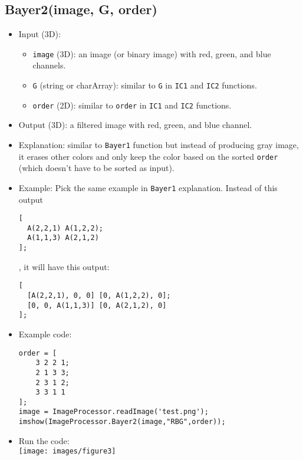 \documentclass[11pt]{amsart}
\theoremstyle{remark}
\providecommand{\tightlist}{%
  \setlength{\itemsep}{0pt}\setlength{\parskip}{0pt}}
\theoremstyle{definition}
\theoremstyle{remark}
\numberwithin{equation}{section}
\begin{document}
\subsection{Bayer2(image, G, order)}\label{bayer2image-g-order}

\begin{itemize}
\item
  Input (3D):

  \begin{itemize}
  \tightlist
  \item
    \texttt{image} (3D): an image (or binary image) with red, green, and
    blue channels.
  \item
    \texttt{G} (string or charArray): similar to \texttt{G} in
    \texttt{IC1} and \texttt{IC2} functions.
  \item
    \texttt{order} (2D): similar to \texttt{order} in \texttt{IC1} and
    \texttt{IC2} functions.
  \end{itemize}
\item
  Output (3D): a filtered image with red, green, and blue channel.
\item
  Explanation: similar to \texttt{Bayer1} function but instead of
  producing gray image, it erases other colors and only keep the color
  based on the sorted \texttt{order} (which doesn't have to be sorted as
  input).
\item
  Example: Pick the same example in \texttt{Bayer1} explanation. Instead
  of this output

\begin{verbatim}
[
  A(2,2,1) A(1,2,2);
  A(1,1,3) A(2,1,2)
];
\end{verbatim}

  , it will have this output:

\begin{verbatim}
[
  [A(2,2,1), 0, 0] [0, A(1,2,2), 0];
  [0, 0, A(1,1,3)] [0, A(2,1,2), 0]
];
\end{verbatim}
\item
  Example code:

\begin{verbatim}
order = [
    3 2 2 1;
    2 1 3 3;
    2 3 1 2;
    3 3 1 1
];
image = ImageProcessor.readImage('test.png');
imshow(ImageProcessor.Bayer2(image,"RBG",order));
\end{verbatim}
\item
  Run the code:\\
  \texttt{[image: images/figure3]}
\end{itemize}
\end{document}
